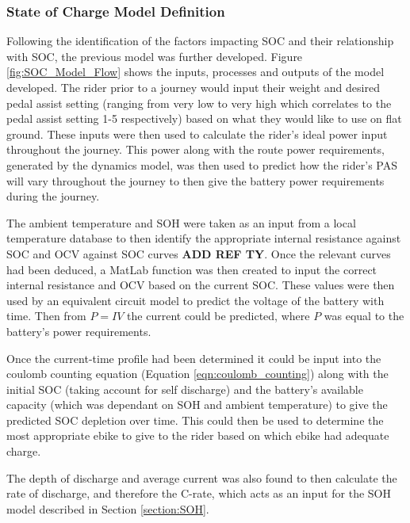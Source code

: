 \documentclass[a4paper, 10pt]{article}
\numberwithin{equation}{section}
\begin{document}

\subsubsection{State of Charge Model Definition}

Following the identification of the factors impacting SOC and their relationship with SOC, the previous model was further developed. Figure \ref{fig:SOC_Model_Flow} shows the inputs, processes and outputs of the model developed. The rider prior to a journey would input their weight and desired pedal assist setting (ranging from very low to very high which correlates to the pedal assist setting 1-5 respectively) based on what they would like to use on flat ground. These inputs were then used to calculate the rider's ideal power input throughout the journey. This power along with the route power requirements, generated by the dynamics model, was then used to predict how the rider's PAS will vary throughout the journey to then give the battery power requirements during the journey. 

The ambient temperature and SOH were taken as an input from a local temperature database to then identify the appropriate internal resistance against SOC and OCV against SOC curves \textbf{ADD REF TY}. Once the relevant curves had been deduced, a MatLab function was then created to input the correct internal resistance and OCV based on the current SOC. These values were then used by an equivalent circuit model to predict the voltage of the battery with time. Then from $P=IV$ the current could be predicted, where $P$ was equal to the battery's power requirements.

Once the current-time profile had been determined it could be input into the coulomb counting equation (Equation \ref{eqn:coulomb_counting}) along with the initial SOC (taking account for self discharge) and the battery's available capacity (which was dependant on SOH and ambient temperature) to give the predicted SOC depletion over time. This could then be used to determine the most appropriate ebike to give to the rider based on which ebike had adequate charge.

The depth of discharge and average current was also found to then calculate the rate of discharge, and therefore the C-rate, which acts as an input for the SOH model described in Section \ref{section:SOH}.
\end{document}

